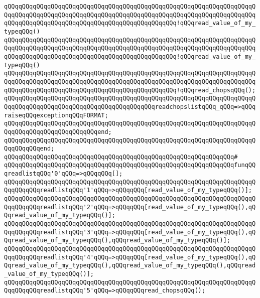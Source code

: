 \verb|qQQqqQQqqQQqqQQqqQQqqQQqqQQqqQQqqQQqqQQqqQQqqQQqqQQqqQQqqQQqqQQqqQQqqQQqqQQqqQQqqQQqqQQqqQQqqQQqqQQqqQQqqQQqqQQqqQQqqQQqqQQqqQQqqQQqqQQqqQQqqQQqqQQqqQQqqQQqqQQqqQQqqQQqqQQqqQQqqQQqqQQqqQQq!qQQqread_value_of_my_typeqQQq()|\newline
\verb|qQQqqQQqqQQqqQQqqQQqqQQqqQQqqQQqqQQqqQQqqQQqqQQqqQQqqQQqqQQqqQQqqQQqqQQqqQQqqQQqqQQqqQQqqQQqqQQqqQQqqQQqqQQqqQQqqQQqqQQqqQQqqQQqqQQqqQQqqQQqqQQqqQQqqQQqqQQqqQQqqQQqqQQqqQQqqQQqqQQqqQQqqQQq!qQQqread_value_of_my_typeqQQq()|\newline
\verb|qQQqqQQqqQQqqQQqqQQqqQQqqQQqqQQqqQQqqQQqqQQqqQQqqQQqqQQqqQQqqQQqqQQqqQQqqQQqqQQqqQQqqQQqqQQqqQQqqQQqqQQqqQQqqQQqqQQqqQQqqQQqqQQqqQQqqQQqqQQqqQQqqQQqqQQqqQQqqQQqqQQqqQQqqQQqqQQqqQQqqQQqqQQq!qQQqread_chopsqQQq();|\newline
\verb|qQQqqQQqqQQqqQQqqQQqqQQqqQQqqQQqqQQqqQQqqQQqqQQqqQQqqQQqqQQqqQQqqQQqqQQqqQQqqQQqqQQqqQQqqQQqqQQqqQQqqQQqqQQqqQQqreadchopslistqQQq_qQQq=>qQQqraiseqQQqexceptionqQQqFORMAT;|\newline
\verb|qQQqqQQqqQQqqQQqqQQqqQQqqQQqqQQqqQQqqQQqqQQqqQQqqQQqqQQqqQQqqQQqqQQqqQQqqQQqqQQqqQQqqQQqqQQqqQQqend;|\newline
\verb|qQQqqQQqqQQqqQQqqQQqqQQqqQQqqQQqqQQqqQQqqQQqqQQqqQQqqQQqqQQqqQQqqQQqqQQqqQQqqQQqend;|\newline
\verb|qQQqqQQqqQQqqQQqqQQqqQQqqQQqqQQqqQQqqQQqqQQqqQQqqQQqqQQqqQQqqQQq#|\newline
\verb|qQQqqQQqqQQqqQQqqQQqqQQqqQQqqQQqqQQqqQQqqQQqqQQqqQQqqQQqqQQqqQQqfunqQQqreadlistqQQq'0'qQQq=>qQQqqQQq[];|\newline
\verb|qQQqqQQqqQQqqQQqqQQqqQQqqQQqqQQqqQQqqQQqqQQqqQQqqQQqqQQqqQQqqQQqqQQqqQQqqQQqqQQqreadlistqQQq'1'qQQq=>qQQqqQQq[read_value_of_my_typeqQQq()];|\newline
\verb|qQQqqQQqqQQqqQQqqQQqqQQqqQQqqQQqqQQqqQQqqQQqqQQqqQQqqQQqqQQqqQQqqQQqqQQqqQQqqQQqreadlistqQQq'2'qQQq=>qQQqqQQq[read_value_of_my_typeqQQq(),qQQqread_value_of_my_typeqQQq()];|\newline
\verb|qQQqqQQqqQQqqQQqqQQqqQQqqQQqqQQqqQQqqQQqqQQqqQQqqQQqqQQqqQQqqQQqqQQqqQQqqQQqqQQqreadlistqQQq'3'qQQq=>qQQqqQQq[read_value_of_my_typeqQQq(),qQQqread_value_of_my_typeqQQq(),qQQqread_value_of_my_typeqQQq()];|\newline
\verb|qQQqqQQqqQQqqQQqqQQqqQQqqQQqqQQqqQQqqQQqqQQqqQQqqQQqqQQqqQQqqQQqqQQqqQQqqQQqqQQqreadlistqQQq'4'qQQq=>qQQqqQQq[read_value_of_my_typeqQQq(),qQQqread_value_of_my_typeqQQq(),qQQqread_value_of_my_typeqQQq(),qQQqread_value_of_my_typeqQQq()];|\newline
\verb|qQQqqQQqqQQqqQQqqQQqqQQqqQQqqQQqqQQqqQQqqQQqqQQqqQQqqQQqqQQqqQQqqQQqqQQqqQQqqQQqreadlistqQQq'5'qQQq=>qQQqqQQqread_chopsqQQq();|\newline
